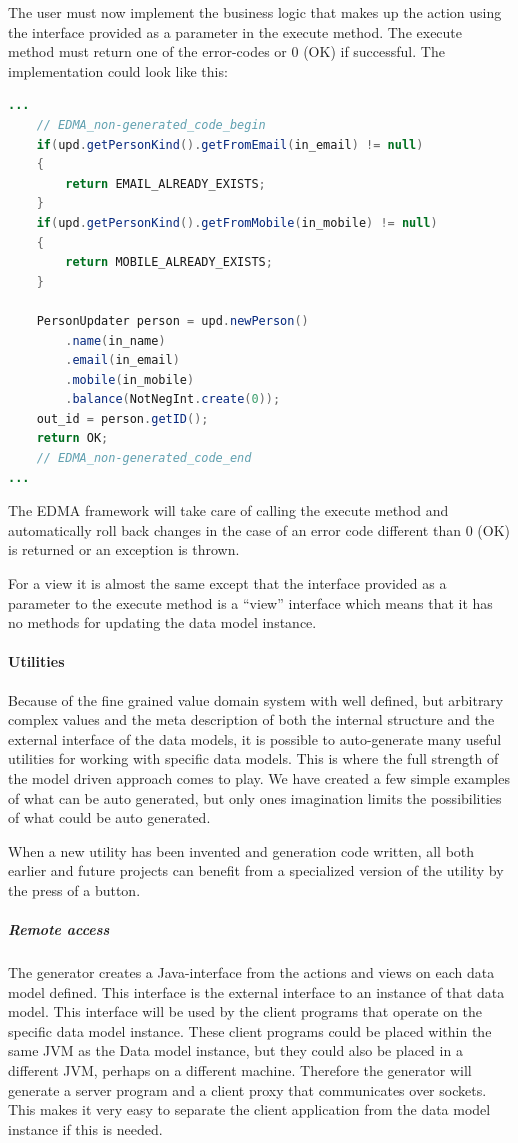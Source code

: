 The user must now implement the business logic that makes up the action
using the interface provided as a parameter in the execute method.
The execute method must return one of the error-codes or 0 (OK) if
successful. The implementation could look like this:

\begin{lstlisting}[language=java,frame=l,breaklines=true]
...
	// EDMA_non-generated_code_begin
	if(upd.getPersonKind().getFromEmail(in_email) != null)
	{
		return EMAIL_ALREADY_EXISTS;
	}
	if(upd.getPersonKind().getFromMobile(in_mobile) != null)
	{
		return MOBILE_ALREADY_EXISTS;
	}
	
	PersonUpdater person = upd.newPerson()
		.name(in_name)
		.email(in_email)
		.mobile(in_mobile)
		.balance(NotNegInt.create(0));
	out_id = person.getID();
	return OK;
	// EDMA_non-generated_code_end
...
\end{lstlisting}

The EDMA framework will take care of calling the execute method and
automatically roll back changes in the case of an error code different
than 0 (OK) is returned or an exception is thrown.

For a view it is almost the same except that the interface provided
as a parameter to the execute method is a ``view'' interface which
means that it has no methods for updating the data model instance.


\paragraph{Utilities}

Because of the fine grained value domain system with well defined,
but arbitrary complex values and the meta description of both the
internal structure and the external interface of the data models,
it is possible to auto-generate many useful utilities for working
with specific data models. This is where the full strength of the
model driven approach comes to play. We have created a few simple
examples of what can be auto generated, but only ones imagination
limits the possibilities of what could be auto generated.

When a new utility has been invented and generation code written,
all both earlier and future projects can benefit from a specialized
version of the utility by the press of a button.


\subparagraph{Remote access}

The generator creates a Java-interface from the actions and views
on each data model defined. This interface is the external interface
to an instance of that data model. This interface will be used by
the client programs that operate on the specific data model instance.
These client programs could be placed within the same JVM as the Data
model instance, but they could also be placed in a different JVM,
perhaps on a different machine. Therefore the generator will generate
a server program and a client proxy that communicates over sockets.
This makes it very easy to separate the client application from the
data model instance if this is needed.

